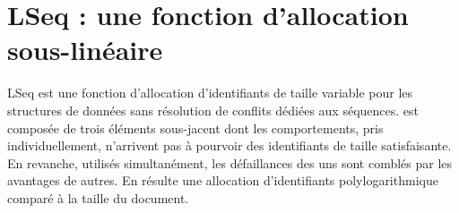 
\chapter{LSeq : une fonction d'allocation sous-linéaire}
\label{repl:chap:lseq}
\minitoc

\lettrine{L}Seq est une fonction d'allocation d'identifiants de taille variable
pour les structures de données sans résolution de conflits dédiées aux
séquences. \LSEQ est composée de trois éléments sous-jacent dont les
comportements, pris individuellement, n'arrivent pas à pourvoir des identifiants
de taille satisfaisante. En revanche, utilisés simultanément, les défaillances
des uns sont comblés par les avantages de autres. En résulte une allocation
d'identifiants polylogarithmique comparé à la taille du document.
